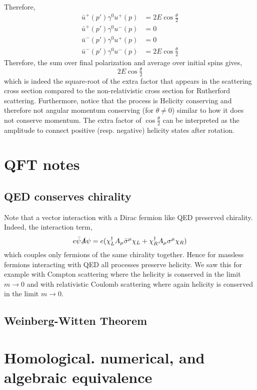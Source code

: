 \documentclass[12pt]{article}
\begin{document}
Therefore, 
\begin{align*}
\bar{u}^{+}(p') \gamma^0 u^{+}(p) & = 2 E \cos{\tfrac{\theta}{2}} 
\\
\bar{u}^{+}(p') \gamma^0 u^{-}(p) & = 0
\\
\bar{u}^{-}(p') \gamma^0 u^{+}(p) & = 0
\\
\bar{u}^{-}(p') \gamma^0 u^{-}(p) & = 2 E \cos{\tfrac{\theta}{2}} 
\end{align*}
Therefore, the sum over final polarization and average over initial spins gives,
\[ 2 E \cos{\tfrac{\theta}{2}} \]
which is indeed the square-root of the extra factor that appears in the scattering cross section compared to the non-relativistic cross section for Rutherford scattering. Furthermore, notice that the process is Helicity conserving and therefore not angular momentum conserving (for $\theta \neq 0$) similar to how it does not conserve momentum. The extra factor of $\cos{\tfrac{\theta}{2}}$ can be interpreted as the amplitude to connect positive (resp. negative) helicity states after rotation.

\section{QFT notes}

\subsection{QED conserves chirality}

Note that a vector interaction with a Dirac fermion like QED preserved chirality. Indeed, the interaction term,
\[ e \bar{\psi} \slashed{A} \psi = e (\chi_L^{\dagger} A_\mu \bar{\sigma}^\mu \chi_L + \chi_R^{\dagger} A_\mu \sigma^\mu \chi_R) \]
which couples only fermions of the same chirality together. Hence for massless fermions interacting with QED all processes preserve helicity. We saw this for example with Compton scattering where the helicity is conserved in the limit $m \to 0$ and with relativistic Coulomb scattering where again helicity is conserved in the limit $m \to 0$.

\subsection{Weinberg-Witten Theorem}

\section{Homological. numerical, and algebraic equivalence}
\end{document}
